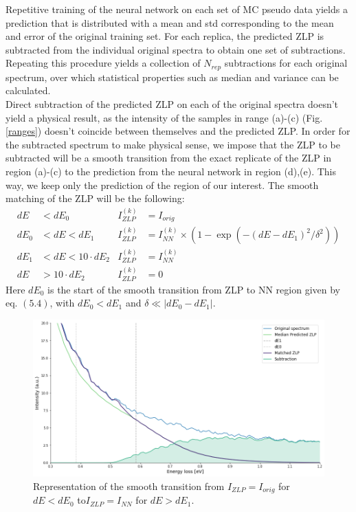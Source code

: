 Repetitive training of the neural network on each set of MC pseudo data yields a prediction that is distributed with a mean and std corresponding to the mean and error of the original training set. For each replica, the predicted ZLP is subtracted from the individual original spectra to obtain one set of subtractions. Repeating this procedure yields a collection of $N_{rep}$ subtractions for each original spectrum, over which statistical properties such as median and variance can be calculated. \\

Direct subtraction of the predicted ZLP on each of the original spectra doesn't yield a physical result, as the intensity of the samples in range (a)-(c) (Fig. \ref{ranges}) doesn't coincide between themselves and the predicted ZLP. In order for the subtracted spectrum to make physical sense, we impose that the ZLP to be subtracted will be a smooth transition from the exact replicate of the ZLP in region (a)-(c) to the prediction from the neural network in region (d),(e). This way, we keep only the prediction of the region of our interest. The smooth matching of the ZLP will be the following:
\begin{align}
 dE &< dE_0          &   I_{ZLP}^{(k)} &= I_{orig}\\
 dE_0 &< dE < dE_1   &  I_{ZLP}^{(k)} &= I_{NN}^{(k)} \times  \left( 1 - \exp(-(dE - dE_1)^2/\delta^2)\right) \\
 dE_1 &< dE < 10 \cdot dE_2 &  I_{ZLP}^{(k)} &= I_{NN}^{(k)}\\
 dE &> 10 \cdot dE_2 &   I_{ZLP}^{(k)} &= 0
\end{align}
Here $dE_0$ is the start of the smooth transition from ZLP to NN region given by eq. $(5.4)$, with $dE_0<dE_1$  and $\delta \ll |dE_0 - dE_1|$. 

\begin{figure}[H]
    \centering
    \includegraphics[width=120mm]{plots/matching.png}
    \caption{Representation of the smooth transition from $I_{ZLP} = I_{orig}$ for $dE<dE_0$ to$I_{ZLP} = I_{NN}$ for $dE>dE_1$. }
    \label{fig:my_label}
\end{figure}



